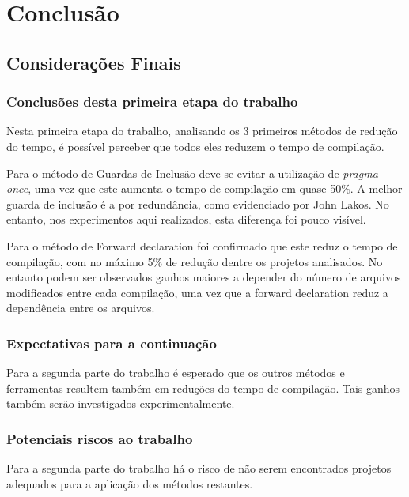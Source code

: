 \part{Conclusão}

\chapter[Considerações Finais]{Considerações Finais}

\section{Conclusões desta primeira etapa do trabalho}

Nesta primeira etapa do trabalho, analisando os 3 primeiros
 métodos de redução do tempo, é possível perceber que todos
 eles reduzem o tempo de compilação.

Para o método de Guardas de Inclusão deve-se evitar a
 utilização de \textit{pragma once}, uma vez que este aumenta
 o tempo de compilação em quase 50\%. A melhor guarda
 de inclusão é a por redundância, como evidenciado por
 John Lakos. No entanto, nos experimentos aqui realizados,
 esta diferença foi pouco visível.

Para o método de Forward declaration foi confirmado que
 este reduz o tempo de compilação, com no máximo 5\% de redução
 dentre os projetos analisados. No entanto podem ser observados
 ganhos maiores a depender do número de arquivos modificados
 entre cada compilação, uma vez que a forward declaration
 reduz a dependência entre os  arquivos.

\section{Expectativas para a continuação}

Para a segunda parte do trabalho é esperado que os
 outros métodos e ferramentas resultem também em
 reduções do tempo de compilação. Tais ganhos
 também serão investigados experimentalmente.  

\section{Potenciais riscos ao trabalho}

Para a segunda parte do trabalho há o risco de não 
serem encontrados projetos adequados para a aplicação
 dos métodos restantes.

